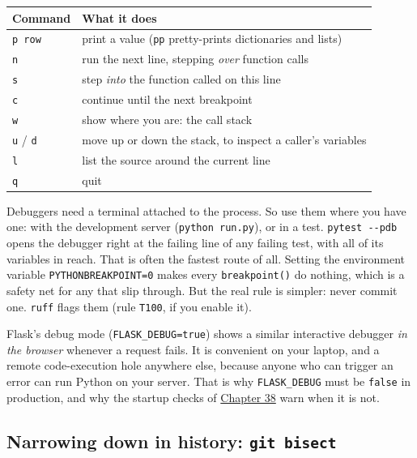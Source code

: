 
{\def\LTcaptype{none} %
\begin{longtable}[]{@{}ll@{}}
\toprule\noalign{}
Command & What it does \\
\midrule\noalign{}
\endhead
\bottomrule\noalign{}
\endlastfoot
\texttt{p\ row} & print a value (\texttt{pp} pretty-prints dictionaries and lists) \\
\texttt{n} & run the next line, stepping \emph{over} function calls \\
\texttt{s} & step \emph{into} the function called on this line \\
\texttt{c} & continue until the next breakpoint \\
\texttt{w} & show where you are: the call stack \\
\texttt{u} / \texttt{d} & move up or down the stack, to inspect a caller's variables \\
\texttt{l} & list the source around the current line \\
\texttt{q} & quit \\
\end{longtable}
}

Debuggers need a terminal attached to the process. So use them where you have one: with the development server (\texttt{python\ run.py}), or in a test. \texttt{pytest\ -\/-pdb} opens the debugger right at the failing line of any failing test, with all of its variables in reach. That is often the fastest route of all. Setting the environment variable \texttt{PYTHONBREAKPOINT=}\allowbreak{}\texttt{0} makes every \texttt{breakpoint()} do nothing, which is a safety net for any that slip through. But the real rule is simpler: never commit one. \texttt{ruff} flags them (rule \texttt{T100}, if you enable it).

Flask's debug mode (\texttt{FLASK\_DEBUG=true}) shows a similar interactive debugger \emph{in the browser} whenever a request fails. It is convenient on your laptop, and a remote code-execution hole anywhere else, because anyone who can trigger an error can run Python on your server. That is why \texttt{FLASK\_DEBUG} must be \texttt{false} in production, and why the startup checks of \hyperref[ch:38-security]{Chapter 38} warn when it is not.

\subsection*{\texorpdfstring{Narrowing down in history: \texttt{git\ bisect}}{Narrowing down in history: git bisect}}\label{16-logging-error-handling:narrowing-down-in-history-git-bisect}

